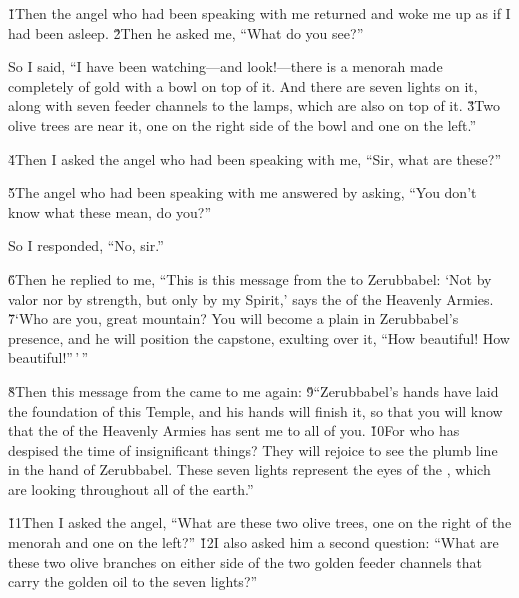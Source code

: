 \v{1}Then the angel who had been speaking with me returned and woke me up as if I had been asleep. \v{2}Then he asked me, ``What do you see?''

So I said, ``I have been watching---and look!---there is a menorah made completely of gold with a bowl on top of it. And there are seven lights on it, along with seven feeder channels to the lamps, which are also on top of it. \v{3}Two olive trees are near it, one on the right side of the bowl and one on the left.''

\v{4}Then I asked the angel who had been speaking with me, ``Sir, what are these?''

\v{5}The angel who had been speaking with me answered by asking, ``You don't know what these mean, do you?''

So I responded, ``No, sir.''

\v{6}Then he replied to me, ``This is this message from the  to Zerubbabel: `Not by valor nor by strength, but only by my Spirit,' says the  of the Heavenly Armies. \v{7}`Who are you, great mountain? You will become a plain in Zerubbabel's presence, and he will position the capstone, exulting over it, ``How beautiful! How beautiful!''\,'\,''

\v{8}Then this message from the  came to me again: \v{9}``Zerubbabel's hands have laid the foundation of this Temple, and his hands will finish it, so that you will know that the  of the Heavenly Armies has sent me to all of you. \v{10}For who has despised the time of insignificant things? They will rejoice to see the plumb line in the hand of Zerubbabel. These seven lights represent the eyes of the , which are looking throughout all of the earth.''

\v{11}Then I asked the angel, ``What are these two olive trees, one on the right of the menorah and one on the left?'' \v{12}I also asked him a second question: ``What are these two olive branches on either side of the two golden feeder channels that carry the golden oil to the seven lights?''

